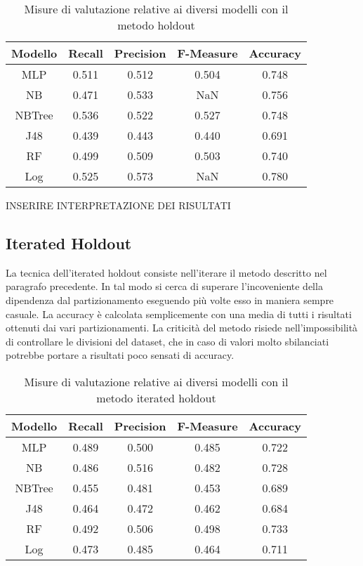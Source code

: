 \begin{table}[H]
\tabcolsep=0.10cm
\small
    \centering
    \begin{tabular}{ccccc}
     Modello & Recall & Precision & F-Measure & Accuracy  \\
     \hline
     MLP & 0.511 & 0.512 & 0.504 & 0.748 \\
     NB & 0.471 & 0.533 & NaN & 0.756 \\
     NBTree & 0.536 & 0.522 & 0.527 & 0.748 \\
     J48 & 0.439 & 0.443 & 0.440 & 0.691 \\
     RF & 0.499 & 0.509 & 0.503 & 0.740 \\
     Log & 0.525 & 0.573 & NaN & 0.780 \\
     \hline
    \end{tabular}
    \caption{Misure di valutazione relative ai diversi modelli con il metodo holdout}
\end{table}

INSERIRE INTERPRETAZIONE DEI RISULTATI
\subsection{Iterated Holdout}

La tecnica dell'iterated holdout consiste nell'iterare il metodo descritto nel paragrafo precedente. In tal modo si cerca di superare l'incoveniente della dipendenza dal partizionamento eseguendo più volte esso in maniera sempre casuale. La accuracy è calcolata semplicemente con una media di tutti i risultati ottenuti dai vari partizionamenti. La criticità del metodo risiede nell'impossibilità di controllare le divisioni del dataset, che in caso di valori molto sbilanciati potrebbe portare a risultati poco sensati di accuracy.


\begin{table}[H]
\tabcolsep=0.10cm
\small
\begin{tabular}{ccccc}

     Modello & Recall & Precision & F-Measure & Accuracy  \\
     \hline
     MLP & 0.489 & 0.500 & 0.485 & 0.722 \\
     NB & 0.486 & 0.516 & 0.482 & 0.728 \\
     NBTree & 0.455 & 0.481 & 0.453 & 0.689 \\
     J48 & 0.464 & 0.472 & 0.462 & 0.684 \\
     RF & 0.492 & 0.506 & 0.498 & 0.733 \\
     Log & 0.473 & 0.485 & 0.464 & 0.711 \\
     \hline
\end{tabular}
\caption{Misure di valutazione relative ai diversi modelli con il metodo iterated holdout}
\end{table}

